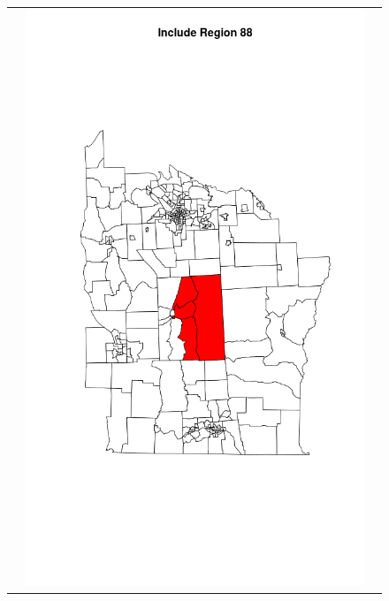 \documentclass[12pt]{article}
\begin{document}
\begin{figure}[!ht]
\begin{tabular}{|c|c|c|}
							& \includegraphics[scale=0.18]{ny88.png}

\end{tabular}
\end{figure}
\end{document}
